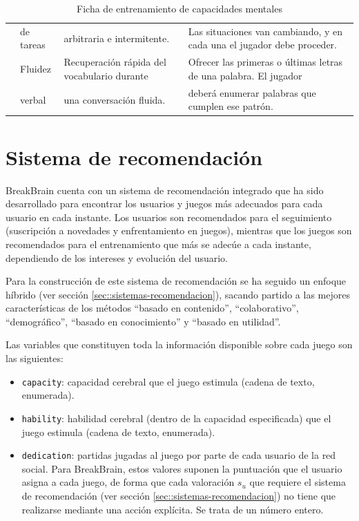 \begin{table}[H]
\begin{footnotesize}
\begin{center}
\begin{sideways}
\begin{tabular}{|c|l|l|l|}
& de tareas & arbitraria e intermitente. & Las situaciones van cambiando, y en cada una el jugador debe proceder. \\
\cline{2-4}
& Fluidez  & Recuperación rápida del vocabulario durante & Ofrecer las primeras o últimas letras de una palabra. El jugador \\
& verbal & una conversación fluida. & deberá enumerar palabras que cumplen ese patrón. \\
\hline
\end{tabular}
\end{sideways}
\end{center}
\end{footnotesize}
\caption{Ficha de entrenamiento de capacidades mentales}
\label{table:capacidades}
\end{table}



\section{Sistema de recomendación}

BreakBrain cuenta con un sistema de recomendación integrado que ha sido desarrollado para encontrar los usuarios y juegos más adecuados para cada usuario en cada instante. Los usuarios son recomendados para el seguimiento (suscripción a novedades y enfrentamiento en juegos), mientras que los juegos son recomendados para el entrenamiento que más se adecúe a cada instante, dependiendo de los intereses y evolución del usuario.

Para la construcción de este sistema de recomendación se ha seguido un enfoque híbrido (ver sección \ref{sec::sistemas-recomendacion}), sacando partido a las mejores características de los métodos ``basado en contenido'', ``colaborativo'', ``demográfico'', ``basado en conocimiento'' y ``basado en utilidad''.

Las variables que constituyen toda la información disponible sobre cada juego son las siguientes:

\begin{itemize}
\item {\tt capacity}: capacidad cerebral que el juego estimula (cadena de texto, enumerada).
\item {\tt hability}: habilidad cerebral (dentro de la capacidad especificada) que el juego estimula (cadena de texto, enumerada).
\item {\tt dedication}: partidas jugadas al juego por parte de cada usuario de la red social. Para BreakBrain, estos valores suponen la puntuación que el usuario asigna a cada juego, de forma que cada valoración $s_u$ que requiere el sistema de recomendación (ver sección \ref{sec::sistemas-recomendacion}) no tiene que realizarse mediante una acción explícita. Se trata de un número entero.
\end{itemize}

